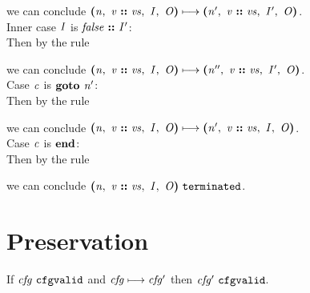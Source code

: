 \documentclass[12pt]{article}
\begin{document}
we can conclude
$\steps{
   \cfg{\nterm{n}}{\cons{\nterm{v}}{\nterm{vs}}}{\nterm{I}}{\nterm{O}}
 }{
   \cfg{\nterm{n'}}{\cons{\nterm{v}}{\nterm{vs}}}{\nterm{I'}}{\nterm{O}}
 }$.\\

Inner case $\nterm{I}$ is $\cons{\nterm{false}}{\nterm{I'}}$:\\

Then by the rule

\begin{mathpar}
\end{mathpar}

we can conclude
$\steps{
   \cfg{\nterm{n}}{\cons{\nterm{v}}{\nterm{vs}}}{\nterm{I}}{\nterm{O}}
 }{
   \cfg{\nterm{n''}}{\cons{\nterm{v}}{\nterm{vs}}}{\nterm{I'}}{\nterm{O}}
 }$.\\

Case $\nterm{c}$ is $\goto{\nterm{n'}}$:\\

Then by the rule

\begin{mathpar}
\end{mathpar}

we can conclude
$\steps{
   \cfg{\nterm{n}}{\cons{\nterm{v}}{\nterm{vs}}}{\nterm{I}}{\nterm{O}}
 }{
   \cfg{\nterm{n'}}{\cons{\nterm{v}}{\nterm{vs}}}{\nterm{I}}{\nterm{O}}
 }$.\\

Case $\nterm{c}$ is $\progend$:\\

Then by the rule

\begin{mathpar}
\end{mathpar}

we can conclude
$\terminated{\cfg{\nterm{n}}{\cons{\nterm{v}}{\nterm{vs}}}{\nterm{I}}{\nterm{O}}}$.

\section{Preservation}

If $\cfgvalid{\nterm{cfg}}$ and $\steps{\nterm{cfg}}{\nterm{cfg'}}$ then
$\cfgvalid{\nterm{cfg'}}$.
\end{document}
